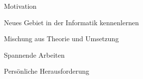 \begin{frame}[t]{Motivation}
  \begin{bigitemize}[<+->]{3mm}
		\item{Neues Gebiet in der Informatik kennenlernen}

		\item{Mischung aus Theorie und Umsetzung}

		\item{Spannende Arbeiten}

		\item{Persönliche Herausforderung}
	\end{bigitemize}
\end{frame}
